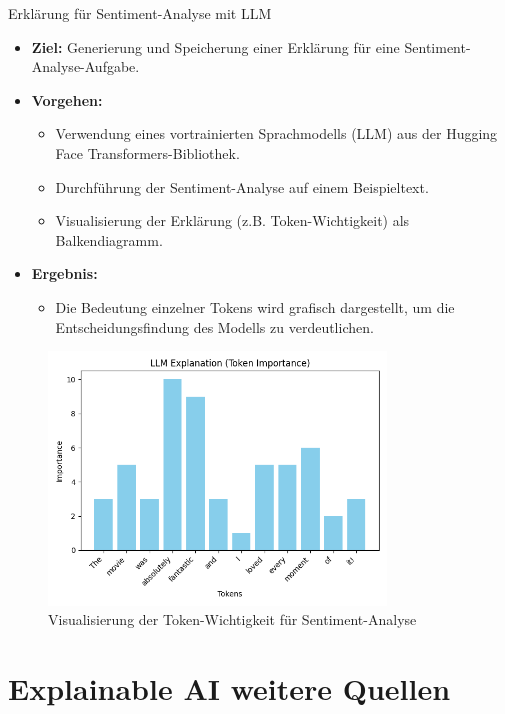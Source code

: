 \documentclass[aspectratio=1610, xcolor=dvipsnames, 9pt]{beamer}
\begin{document}
\begin{frame}{Erklärung für Sentiment-Analyse mit LLM}
  \begin{itemize}
    \item \textbf{Ziel:} Generierung und Speicherung einer Erklärung für eine Sentiment-Analyse-Aufgabe.
    \item \textbf{Vorgehen:}
    \begin{itemize}
      \item Verwendung eines vortrainierten Sprachmodells (LLM) aus der Hugging Face Transformers-Bibliothek.
      \item Durchführung der Sentiment-Analyse auf einem Beispieltext.
      \item Visualisierung der Erklärung (z.B. Token-Wichtigkeit) als Balkendiagramm.
    \end{itemize}
    \item \textbf{Ergebnis:} 
    \begin{itemize}
      \item Die Bedeutung einzelner Tokens wird grafisch dargestellt, um die Entscheidungsfindung des Modells zu verdeutlichen.
    \end{itemize}
  \end{itemize}
  \begin{figure}
    \centering
    \includegraphics[width=0.8\textwidth]{images/sentiment_explanation.png}
    \caption{Visualisierung der Token-Wichtigkeit für Sentiment-Analyse}
  \end{figure}
\end{frame}
\section{Explainable AI weitere Quellen}
\end{document}
